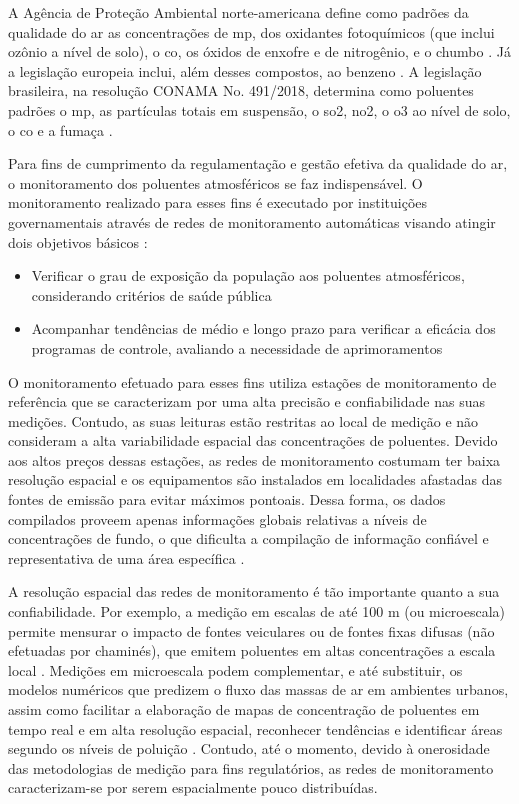 A Agência de Proteção Ambiental norte-americana define como padrões da qualidade do ar as concentrações de \acrfull{mp}, dos oxidantes fotoquímicos (que inclui ozônio a nível de solo), o \acrfull{co}, os óxidos de enxofre e de nitrogênio, e o chumbo \cite{USEPA2021CriteriaEPA}. Já a legislação europeia inclui, além desses compostos, ao benzeno \cite{UE2021}. A legislação brasileira, na resolução CONAMA No. 491/2018, determina como poluentes padrões o \acrfull{mp}, as partículas totais em suspensão, o \acrfull{so2}, \acrfull{no2}, o \acrfull{o3} ao nível de solo, o \acrfull{co} e a fumaça \cite{CONAMA2018}.

Para fins de cumprimento da regulamentação e gestão efetiva da qualidade do ar, o monitoramento dos poluentes atmosféricos se faz indispensável. O monitoramento realizado para esses fins é executado por instituições governamentais através de redes de monitoramento automáticas visando atingir dois objetivos básicos \cite{Franca2019GUIAAR}:

\begin{itemize}
    \item Verificar o grau de exposição da população aos poluentes atmosféricos, considerando critérios de saúde pública
    \item Acompanhar tendências de médio e longo prazo para verificar a eficácia dos programas de controle, avaliando a necessidade de aprimoramentos
\end{itemize}

O monitoramento efetuado para esses fins utiliza estações de monitoramento de referência que se caracterizam por uma alta precisão e confiabilidade nas suas medições. Contudo, as suas leituras estão restritas ao local de medição e não consideram a alta variabilidade espacial das concentrações de poluentes. Devido aos altos preços dessas estações, as redes de monitoramento costumam ter baixa resolução espacial e os equipamentos são instalados em localidades afastadas das fontes de emissão para evitar máximos pontoais. Dessa forma, os dados compilados proveem apenas informações globais relativas a níveis de concentrações de fundo, o que dificulta a compilação de informação confiável e representativa de uma área específica \cite{Kumar2015}.

A resolução espacial das redes de monitoramento é tão importante quanto a sua confiabilidade. Por exemplo, a medição em escalas de até 100 m (ou microescala) permite mensurar o impacto de fontes veiculares ou de fontes fixas difusas (não efetuadas por chaminés), que emitem poluentes em altas concentrações a escala local \cite{Franca2019GUIAAR}. Medições em microescala podem complementar, e até substituir, os modelos numéricos que predizem o fluxo das massas de ar em ambientes urbanos, assim como facilitar a elaboração de mapas de concentração de poluentes em tempo real e em alta resolução espacial, reconhecer tendências e identificar áreas segundo os níveis de poluição \cite{Kumar2015}. Contudo, até o momento, devido à onerosidade das metodologias de medição para fins regulatórios, as redes de monitoramento caracterizam-se por serem espacialmente pouco distribuídas.





